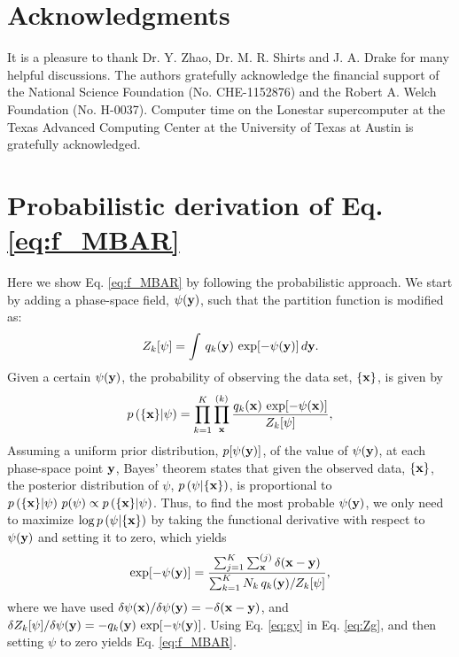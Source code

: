 \documentclass[reprint,aip,jcp,superscriptaddress]{revtex4-1}
\begin{document}
\section{Acknowledgments}





It is a pleasure to thank
Dr. Y. Zhao, Dr. M. R. Shirts and J. A. Drake
for many helpful discussions.
%
The authors gratefully acknowledge
the financial support of
the National Science Foundation (No. CHE-1152876)
and
the Robert A. Welch Foundation (No. H-0037).
%
Computer time on the Lonestar supercomputer
at the Texas Advanced Computing Center
at the University of Texas at Austin
is gratefully acknowledged.




\appendix





\section{\label{sec:deriveMBAR}
Probabilistic derivation of Eq. \eqref{eq:f_MBAR}}



Here we show
Eq. \eqref{eq:f_MBAR} by
following the probabilistic approach\cite{
bartels1997, *habeck2007, *habeck2012}.
%
We start by adding a phase-space field, $\psi(\mathbf{y})$,
such that the partition function is modified as:
%
\begin{equation}
Z_k[\psi]
=
\int \, q_k(\mathbf{y}) \, \exp[-\psi(\mathbf{y})] \, d\mathbf{y}.
\label{eq:Zg}
\end{equation}
%
Given a certain $\psi(\mathbf{y})$,
the probability of observing the data set,
$\{ \mathbf{x} \}$,
is given by
%
\begin{equation*}
p\left( \{ \mathbf{x} \} | \psi \right)
=
\prod_{k = 1}^K
\prod_{\mathbf{x}}^{(k)}
\frac{ q_k(\mathbf{x}) \, \exp[-\psi(\mathbf{x})] }
     { Z_k[\psi] },
\end{equation*}
%
Assuming a uniform prior distribution,
$p[\psi(\mathbf{y})]$, of the value of $\psi(\mathbf{y})$,
at each phase-space point $\mathbf{y}$,
Bayes' theorem\cite{leonard} states that
given the observed data, $\{\mathbf{x}\}$,
the posterior distribution of $\psi$,
$p\left( \psi | \{ \mathbf{x} \} \right)$,
is proportional to
$p\left( \{ \mathbf{x} \} | \psi \right) \, p(\psi) \propto p\left( \{ \mathbf{x} \} | \psi \right)$.
%
Thus,
to find the most probable $\psi(\mathbf{y})$,
we only need to maximize
$\log p\left( \psi | \{ \mathbf{x} \} \right)$
by taking the functional derivative
with respect to $\psi(\mathbf{y})$
and setting it to zero,
which yields
%
\begin{equation}
\exp[-\psi(\mathbf{y})]
=
\frac{
  \sum_{j = 1}^K \sum_{\mathbf{x}}^{(j)} \delta(\mathbf{x} - \mathbf{y})
}
{
  \sum_{k = 1}^K N_k \, q_k(\mathbf{y}) / Z_k[\psi]
},
\label{eq:gy}
\end{equation}
%
where we have used
$\delta \psi(\mathbf{x}) / \delta \psi(\mathbf{y}) = -\delta(\mathbf{x} - \mathbf{y})$,
and
$\delta Z_k[\psi] / \delta \psi(\mathbf{y}) = -q_k(\mathbf{y}) \, \exp[-\psi(\mathbf{y})]$.
%
Using Eq. \eqref{eq:gy}
in Eq. \eqref{eq:Zg},
and then setting $\psi$ to zero
yields Eq. \eqref{eq:f_MBAR}.
\end{document}
